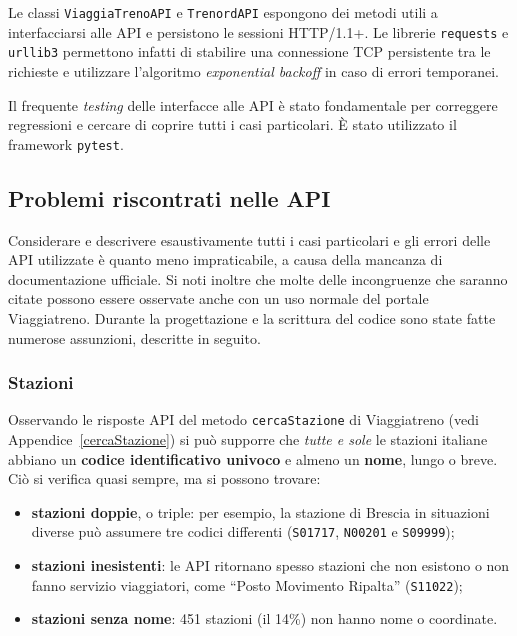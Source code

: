 \documentclass[12pt,italian]{report}
\begin{document}
Le classi \texttt{ViaggiaTrenoAPI} e \texttt{TrenordAPI} espongono dei
metodi utili a interfacciarsi alle API e persistono le sessioni
HTTP/1.1+.  Le librerie \texttt{requests} e \texttt{urllib3}
permettono infatti di stabilire una connessione TCP persistente tra le
richieste e utilizzare l'algoritmo \textit{exponential backoff} in
caso di errori temporanei.

Il frequente \textit{testing} delle interfacce alle API è stato
fondamentale per correggere regressioni e cercare di coprire tutti i
casi particolari.  È stato utilizzato il framework \texttt{pytest}.

\subsection{Problemi riscontrati nelle API}

Considerare e descrivere esaustivamente tutti i casi particolari e gli
errori delle API utilizzate è quanto meno impraticabile, a causa della
mancanza di documentazione ufficiale.  Si noti inoltre che molte delle
incongruenze che saranno citate possono essere osservate anche con un
uso normale del portale Viaggiatreno.  Durante la progettazione e la
scrittura del codice sono state fatte numerose assunzioni, descritte
in seguito.

\subsubsection{Stazioni}

Osservando le risposte API del metodo \texttt{cercaStazione} di
Viaggiatreno (vedi Appendice~\ref{cercaStazione}) si può supporre che
\textit{tutte e sole} le stazioni italiane abbiano un \textbf{codice
    identificativo univoco} e almeno un \textbf{nome}, lungo o breve.
Ciò si verifica quasi sempre, ma si possono trovare:
\begin{itemize}
    \item \textbf{stazioni doppie}, o triple: per esempio, la stazione
    di Brescia in situazioni diverse può assumere tre codici
    differenti (\texttt{S01717}, \texttt{N00201} e \texttt{S09999});
    \item \textbf{stazioni inesistenti}: le API ritornano spesso
    stazioni che non esistono o non fanno servizio viaggiatori, come
    ``Posto Movimento Ripalta'' (\texttt{S11022});
    \item \textbf{stazioni senza nome}: 451 stazioni (il 14\%) non
    hanno nome o coordinate.
\end{itemize}
\end{document}
